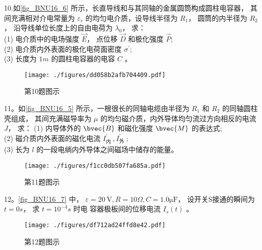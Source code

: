 10.如\autoref{fig_BNU16_6} 所示，长直导线和与其同轴的金属圆筒构成圆柱电容器， 其间充满相对介电常量为 $\varepsilon_{r}$ 的均匀电介质，设导线半径为 $R_{1}$， 圆筒的内半径为 $R_{2}$， 沿导线单位长度上的自由电荷为 $\lambda_{0}$， 求：\\
(1) 电介质中的电场强度 $\vec{E}$， 点位移 $\vec{D}$ 和极化强度 $\vec{P}$;\\
(2) 电介质内外表面的极化电荷面密度 $\sigma^{\prime}$;\\
(3) 长度为 $1 m$ 的圆柱电容器的电容 $C$ 。
\begin{figure}[ht]
\centering
\texttt{[image: ./figures/dd058b2afb704409.pdf]}
\caption{第10题图示} \label{fig_BNU16_6}
\end{figure}

11。如\autoref{fig_BNU16_5} 所示，一根很长的同轴电缆由半径为 $R_{1}$ 和 $R_{2}$ 的同轴圆柱壳组成， 其间充满磁导率为 $\mu$ 的均匀磁介质，内外导体均匀流过方向相反的电流 $J$， 求：
(1) 内导体外的 $\bvec{B}$ 和磁化强度 $\bvec{M}$ 的表达式;\\
(2) 磁介质内外表面的磁化电流 $I_{\text {内 }}^{\prime}, I_{\text {外 }}^{\prime}$;\\
(3) 长为 $l$ 的一段电绱内外导体之间磁场中储存的能量。
\begin{figure}[ht]
\centering
\texttt{[image: ./figures/f1cc0db507fa685a.pdf]}
\caption{第11题图示} \label{fig_BNU16_5}
\end{figure}
12。\autoref{fig_BNU16_7} 中， $\varepsilon=20 \mathrm{~V}, R=10 \Omega, C=1.0\mathrm{\mu F}$， 设开关S接通的瞬间为 $t=0 s$， 求 $t=10^{-4} s$ 时电 容器极板间的位移电流 $I_{s}(t)$ 。
\begin{figure}[ht]
\centering
\texttt{[image: ./figures/df712ad24ffd8e42.pdf]}
\caption{第12题图示} \label{fig_BNU16_7}
\end{figure}
